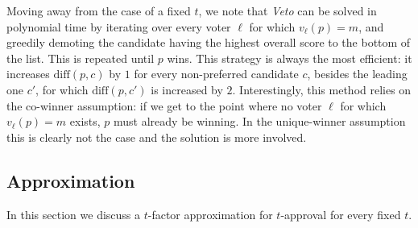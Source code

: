 \documentclass[letterpaper]{article} %
\newcommand{\CMCF}{\emph{minimal cost flow}}
\newcommand{\diff}{\mathrm{diff}}
\begin{document}
Moving away from the case of a fixed $t$, we note that \emph{Veto} can be solved in polynomial time by iterating over every voter $\ell$ for which $v_\ell(p)=m$, and greedily demoting the candidate having the highest overall score to the bottom of the list. This is repeated until $p$ wins. This strategy is always the most efficient: it increases $\diff(p,c)$ by $1$ for every non-preferred candidate $c$, besides the leading one $c'$, for which $\diff(p,c')$ is increased by $2$.
Interestingly, this method relies on the co-winner assumption: if we get to the point where no voter  $\ell$ for which $v_\ell(p)=m$ exists, $p$ must already be winning. In the unique-winner assumption this is clearly not the case and the solution is more involved. 

\subsection{Approximation}
In this section we discuss a $t$-factor approximation for $t$-approval for every fixed $t$. 
\end{document}
